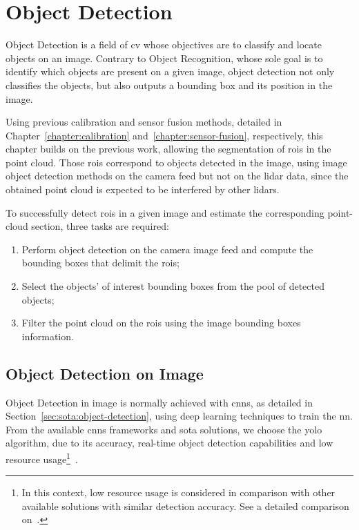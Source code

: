 \chapter{Object Detection}
\label{chapter:object-detection}

Object Detection is a field of \acf{cv} whose objectives are to classify and locate objects on an image. Contrary to Object Recognition, whose sole goal is to identify which objects are present on a given image, object detection not only classifies the objects, but also outputs a bounding box and its position in the image. 

Using previous calibration and sensor fusion methods, detailed in Chapter~\ref{chapter:calibration} and~\ref{chapter:sensor-fusion}, respectively, this chapter builds on the previous work, allowing the segmentation of \acfp{roi} in the point cloud. Those \acp{roi} correspond to objects detected in the image, using image object detection methods on the camera feed but not on the \ac{lidar} data, since the obtained point cloud is expected to be interfered by other \acp{lidar}.

To successfully detect \acp{roi} in a given image and estimate the corresponding point-cloud section, three tasks are required: 
\begin{enumerate}
	\item Perform object detection on the camera image feed and compute the bounding boxes that delimit the \acp{roi};
	\item Select the objects' of interest bounding boxes from the pool of detected objects;
	\item Filter the point cloud on the \acp{roi} using the image bounding boxes information.
\end{enumerate}

\section{Object Detection on Image}
\label{sec:object-detection:image}

Object Detection in image is normally achieved with \acfp{cnn}, as detailed in Section~\ref{sec:sota:object-detection}, using deep learning techniques to train the \acl{nn}. From the available \acp{cnn} frameworks and \acl{sota} solutions, we choose the \acf{yolo} algorithm, due to its accuracy, real-time object detection capabilities and low resource usage\footnote{In this context, low resource usage is considered in comparison with other available solutions with similar detection accuracy. See a detailed comparison on~\cite{Redmon2018}.}~\cite{Redmon2016, Redmon2017}.

